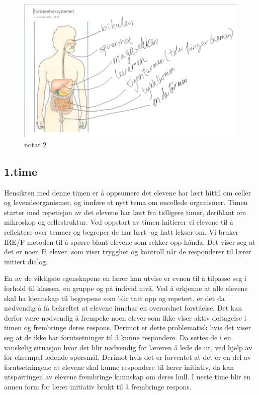 \documentclass[main.tex]{subfiles}
\begin{document}
\begin{figure}[h!]
\includegraphics[scale = 0.6]{../figures/onenote_fordoyelse.png}
\caption{notat 2}
\label{fig:notat2}
\end{figure}

\subsection*{1.time}

Hensikten med denne timen er å oppsumere det elevene har lært hittil om celler og 
levendeorganismer, og innføre et nytt tema om encellede organismer. Timen starter med repetisjon 
av det elevene har lært fra tidligere timer, deriblant om mikroskop og cellestruktur. Ved oppstart 
av timen initierer vi elevene til å reflektere over temaer og begreper de har lært -og hatt lekser 
om. Vi bruker IRE/F metoden til å spørre blant elevene som rekker opp hånda. Det viser seg at det 
er noen få elever, som viser trygghet og kontroll når de responderer til lærer initiert dialog. 

En av de viktigste egenskapene en lærer kan utvise er evnen til å tilpasse seg i forhold til 
klassen, en gruppe og på individ nivå. Ved å erkjenne at alle elevene skal ha kjennskap til 
begrepene som blir tatt opp og repetert, er det da nødvendig å få bekreftet at elevene innehar en 
overordnet forståelse. Det kan derfor være nødvendig å frempeke noen elever som ikke viser aktiv 
deltagelse i timen og frembringe deres respons. Derimot er dette problematisk hvis det viser seg at 
de ikke har forutsetninger til å kunne respondere. Da settes de i en vanskelig situasjon hvor det 
blir nødvendig for læreren å lede de ut, ved hjelp av for eksempel ledende spørsmål. Derimot hvis 
det er forventet at det er en del av forutsetningene at elevene skal kunne respondere til lærer 
initiativ, da kan utspørringen av elevene frembringe kunnskap om deres hull. I neste time blir en 
annen form for lærer initiativ brukt til å frembringe respons. 
 
\end{document}
